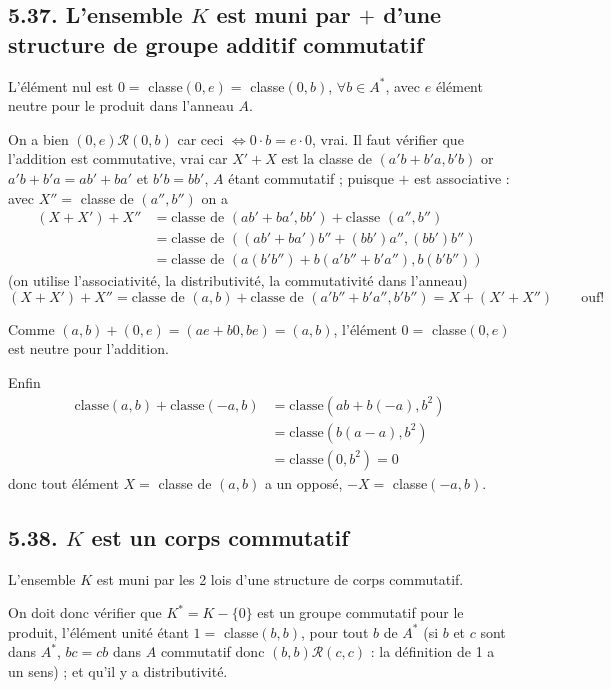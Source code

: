 \subsection*{5.37. L'ensemble $K$ est muni par $+$ d'une structure de groupe additif commutatif}
L'élément nul est $0=$ classe$(0,e)=$ classe$(0,b)$, $\forall b\in A^*$, avec $e$ élément neutre pour le produit dans l'anneau $A$.

On a bien $(0,e)\mathcal R(0,b)$ car ceci $\Longleftrightarrow0\cdot b=e\cdot0$, vrai. Il faut vérifier que l'addition est commutative, vrai car $X'+X$ est la classe de $(a'b+b'a,b'b)$ or $a'b+b'a=ab'+ba'$ et $b'b=bb'$, $A$ étant commutatif ; puisque $+$ est associative : avec $X''=$ classe de $(a'',b'')$ on a
\begin{align*}
(X+X')+X''&=\text{classe de }(ab'+ba',bb')+\text{classe }(a'',b'')\\
&=\text{classe de }((ab'+ba')b''+(bb')a'',(bb')b'')\\
&=\text{classe de }(a(b'b'')+b(a'b''+b'a''),b(b'b''))
\end{align*}
(on utilise l'associativité, la distributivité, la commutativité dans l'anneau)
\[
(X+X')+X''=\text{classe de }(a,b)+\text{classe de }(a'b''+b'a'',b'b'')=X+(X'+X'')\qquad\text{ouf!}
\]

Comme $(a,b)+(0,e)=(ae+b0,be)=(a,b)$, l'élément $0=$ classe$(0,e)$ est neutre pour l'addition.

Enfin
\begin{align*}
\text{classe}(a,b)+\text{classe}(-a,b)&=\text{classe}(ab+b(-a),b^2)\\
&=\text{classe}(b(a-a),b^2)\\
&=\text{classe}(0,b^2)=0
\end{align*}
donc tout élément $X=$ classe de $(a,b)$ a un opposé, $-X=$ classe$(-a,b)$. \bookend

\subsection*{5.38. $K$ est un corps commutatif}
L'ensemble $K$ est muni par les 2 lois d'une structure de corps commutatif.

On doit donc vérifier que $K^*=K-\{0\}$ est un groupe commutatif pour le produit, l'élément unité étant $1=$ classe$(b,b)$, pour tout $b$ de $A^*$ (si $b$ et $c$ sont dans $A^*$, $bc=cb$ dans $A$ commutatif donc $(b,b)\mathcal R(c,c)$ : la définition de 1 a un sens) ; et qu'il y a distributivité.


